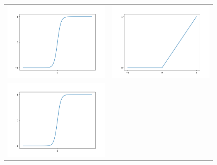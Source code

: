 \documentclass[UTF8,a4paper,8pt,no-math]{article} %
\numberwithin{equation}{section} %
\begin{document}
\begin{figure}[h]
	\center
	\begin{tabular}{cc}
		\includegraphics[scale=0.2]{tanh.png}
		 &
		\includegraphics[scale=0.2]{relu.png} \\
		\includegraphics[scale=0.2]{tanh.png}

\end{tabular}
\end{figure}
\end{document}
